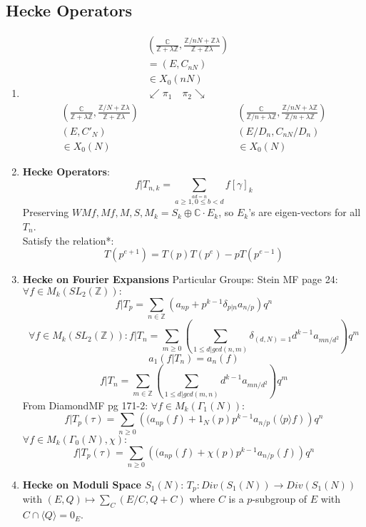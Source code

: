 \documentclass{article}
\newcommand{\C}{\mathbb{C}}
\newcommand{\Z}{\mathbb{Z}}
\newcommand{\ra}{\rightarrow}
\begin{document}
\subsection{Hecke Operators}
\begin{multicols}{2}
\begin{enumerate}

\item \[\begin{array}{ccc}
& \left(\frac{\C}{\Z+\lambda \Z}, \frac{\Z/nN + \Z\lambda}{\Z + \Z\lambda}\right) \\
&  = (E,C_{nN}) \\
&  \in X_0(nN)  \\
& \swarrow \pi_1\,\,\,\,\,\, \pi_2 \searrow \\
\left(\frac{\C}{\Z+\lambda \Z}, \frac{\Z/N + \Z\lambda}{\Z + \Z\lambda}\right) & & \left(\frac{\C}{\Z/n+\lambda \Z}, \frac{\Z/nN + \lambda\Z}{\Z/n + \lambda\Z}\right)\\
(E,C'_N) && (E/D_n, C_{nN}/D_n) \\
\in X_0(N)&& \in X_0(N)
\end{array}\]

\item \textbf{Hecke Operators}:  
\[f|T_{n,k} = \sum_{\overset{ad = n}{a \geq 1, 0 \leq b < d}}f[\gamma]_k\]
Preserving $WMf,Mf,M,S,M_k = S_k \oplus \C\cdot E_k$, so $E_k$'s are eigen-vectors for all $T_n$. \\
Satisfy the relation*:
\[T(p^{e+1}) = T(p)T(p^e) - pT(p^{e-1})\]

\item \textbf{Hecke on Fourier Expansions} Particular Groups:
Stein MF page 24: $\forall f \in M_k(SL_2(\Z)):$
\[ f|T_p = \sum_{n \in \Z} \left(a_{np} + p^{k-1}\delta_{p|n} a_{n/p}\right)q^n\]
\[\forall f \in M_k(SL_2(\Z)): f|T_n = \sum_{m \geq 0}\left(\sum_{1 \leq d|gcd(n,m)} \delta_{(d,N) = 1} d^{k-1} a_{mn/d^2}\right)q^m \]\[ a_1(f|T_n) = a_n(f)\]
\[f|T_n = \sum_{m \in \Z} \left(\sum_{1 \leq d|gcd(m,n)}d^{k-1}a_{mn/d^2}\right)q^m\]
From DiamondMF pg 171-2: $\forall f \in M_k(\Gamma_1(N)):$
\[ f|T_p(\tau) = \sum_{n \geq 0} \left((a_{np}(f) +  1_N(p)p^{k-1} a_{n/p}(\langle p \rangle f) \right)q^{n}\]
$\forall f \in M_k(\Gamma_0(N),\chi):$
\[f|T_p(\tau) = \sum_{n \geq 0} \left((a_{np}(f) +  \chi(p) p^{k-1} a_{n/p}(f) \right)q^{n}\]

\item \textbf{Hecke on Moduli Space $S_1(N)$}: $T_p: Div(S_1(N)) \ra Div(S_1(N))$ with $(E,Q) \mapsto \sum_C (E/C, Q+C)$ where $C$ is a $p$-subgroup of $E$ with $C \cap \langle Q \rangle = 0_E$.


\end{enumerate}
\end{multicols}
\end{document}
